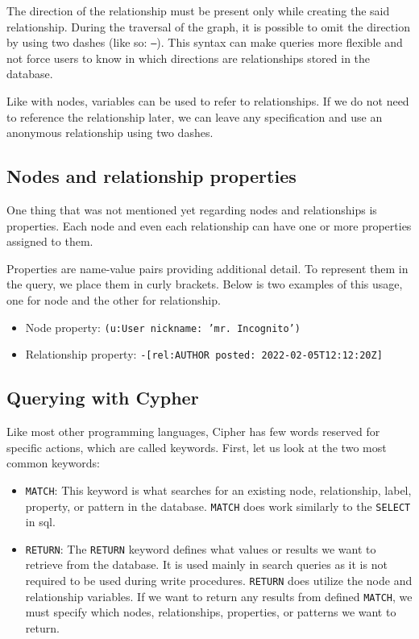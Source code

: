 The direction of the relationship must be present only while creating the said relationship.
During the traversal of the graph, it is possible to omit the direction by using two dashes (like so: \texttt{--}).
This syntax can make queries more flexible and not force users to know in which directions are relationships stored in the database.

Like with nodes, variables can be used to refer to relationships. If we do not need to reference the relationship later,
we can leave any specification and use an anonymous relationship using two dashes.

\subsection{Nodes and relationship properties}

One thing that was not mentioned yet regarding nodes and relationships is properties. Each node and even each relationship can have one or more properties assigned to them.

Properties are name-value pairs providing additional detail. To represent them in the query, we place them in curly brackets. \cite{noauthor_getting_nodate}
Below is two examples of this usage, one for node and the other for relationship.

\begin{itemize}
    \item {Node property: \texttt{(u:User {nickname: 'mr. Incognito'})}}
    \item {Relationship property: \texttt{-[rel:AUTHOR {posted: 2022-02-05T12:12:20Z}]}}
\end{itemize}

\subsection{Querying with Cypher}

Like most other programming languages, Cipher has few words reserved for specific actions, which are called keywords. \cite{noauthor_querying_nodate} First, let us look at the two most common keywords:
\begin{itemize}
    \item {\texttt{MATCH}: This keyword is what searches for an existing node, relationship, label, property, or pattern in the database. \texttt{MATCH} does work similarly to the \texttt{SELECT} in \acrshort{sql}.}
    \item {\texttt{RETURN}: The \texttt{RETURN} keyword defines what values or results we want to retrieve from the database.
          It is used mainly in search queries as it is not required to be used during write procedures.
          \texttt{RETURN} does utilize the node and relationship variables. If we want to return any results from defined \texttt{MATCH},
          we must specify which nodes, relationships, properties, or patterns we want to return.}
\end{itemize}


